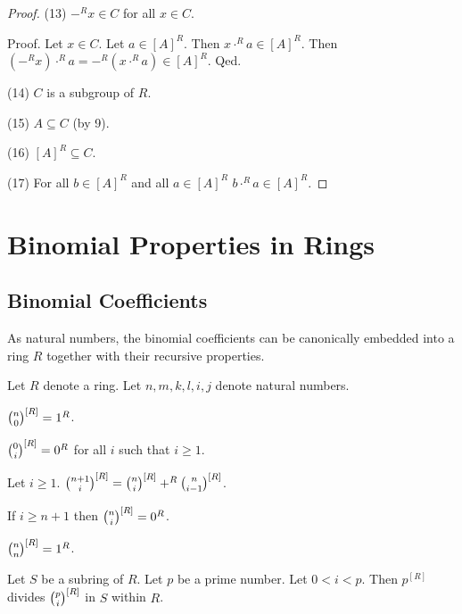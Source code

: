 \documentclass[english,11pt]{article}
\begin{document}
\begin{forthel}
\begin{proof}
(13) $-^{R} x \in C$ for all $x \in C$.

Proof.
Let $x \in C$.
Let $a \in [A]^{R}$. Then $x \cdot^{R} a \in [A]^{R}$.
Then $(-^{R} x) \cdot^{R} a = -^{R} (x\cdot^{R} a) \in [A]^{R}$.
Qed.

(14) $C$ is a subgroup of $R$.

(15) $A \subseteq C$ (by 9). 

(16) $[A]^{R} \subseteq C$.

(17) For all $b \in [A]^{R}$ and all $a \in [A]^{R}$ $b \cdot^{R} a \in [A]^{R}$.

\end{proof}
\end{forthel}

\section{Binomial Properties in Rings}

\subsection{Binomial Coefficients}

As natural numbers, the binomial coefficients can be 
canonically embedded 
into a ring $R$ together with their recursive properties.

\begin{forthel}

Let $R$ denote a ring.
Let $n,m,k,l,i,j$ denote natural numbers.

\begin{lemma}
${n \choose 0}^{[R]} = 1^{R}$.
\end{lemma}

\begin{lemma}
${0 \choose i}^{[R]} = 0^{R}$ for all $i$ such that $i \geq 1$.
\end{lemma}

\begin{lemma} Let $i \geq 1$.
${n+1 \choose i}^{[R]} = {n \choose i}^{[R]} +^{R} {n \choose i-1}^{[R]}$.
\end{lemma}

\begin{lemma}
If $i \geq n + 1$ then ${n \choose i}^{[R]} = 0^{R}$.
\end{lemma}

\begin{theorem} 
${n \choose n}^{[R]} = 1^{R}$.
\end{theorem}

\begin{lemma} Let $S$ be a subring of $R$.
Let $p$ be a prime number.
Let $0 < i < p$. Then
$p^{[R]}$ divides ${p \choose i}^{[R]}$ in $S$ within $R$.
\end{lemma}

\end{forthel}
\end{document}
